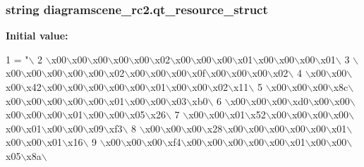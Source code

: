 \subsubsection[{qt\+\_\+resource\+\_\+struct}]{\setlength{\rightskip}{0pt plus 5cm}string diagramscene\+\_\+rc2.\+qt\+\_\+resource\+\_\+struct}\label{namespacediagramscene__rc2_abc24f13854b6fa96199e59b31d757b36}
{\bfseries Initial value\+:}
\begin{DoxyCode}
1 = \textcolor{stringliteral}{"\(\backslash\)}
2 \textcolor{stringliteral}{\(\backslash\)x00\(\backslash\)x00\(\backslash\)x00\(\backslash\)x00\(\backslash\)x00\(\backslash\)x02\(\backslash\)x00\(\backslash\)x00\(\backslash\)x00\(\backslash\)x01\(\backslash\)x00\(\backslash\)x00\(\backslash\)x00\(\backslash\)x01\(\backslash\)}
3 \textcolor{stringliteral}{\(\backslash\)x00\(\backslash\)x00\(\backslash\)x00\(\backslash\)x00\(\backslash\)x00\(\backslash\)x02\(\backslash\)x00\(\backslash\)x00\(\backslash\)x00\(\backslash\)x0f\(\backslash\)x00\(\backslash\)x00\(\backslash\)x00\(\backslash\)x02\(\backslash\)}
4 \textcolor{stringliteral}{\(\backslash\)x00\(\backslash\)x00\(\backslash\)x00\(\backslash\)x42\(\backslash\)x00\(\backslash\)x00\(\backslash\)x00\(\backslash\)x00\(\backslash\)x00\(\backslash\)x01\(\backslash\)x00\(\backslash\)x00\(\backslash\)x02\(\backslash\)x11\(\backslash\)}
5 \textcolor{stringliteral}{\(\backslash\)x00\(\backslash\)x00\(\backslash\)x00\(\backslash\)x8c\(\backslash\)x00\(\backslash\)x00\(\backslash\)x00\(\backslash\)x00\(\backslash\)x00\(\backslash\)x01\(\backslash\)x00\(\backslash\)x00\(\backslash\)x03\(\backslash\)xb0\(\backslash\)}
6 \textcolor{stringliteral}{\(\backslash\)x00\(\backslash\)x00\(\backslash\)x00\(\backslash\)xd0\(\backslash\)x00\(\backslash\)x00\(\backslash\)x00\(\backslash\)x00\(\backslash\)x00\(\backslash\)x01\(\backslash\)x00\(\backslash\)x00\(\backslash\)x05\(\backslash\)x26\(\backslash\)}
7 \textcolor{stringliteral}{\(\backslash\)x00\(\backslash\)x00\(\backslash\)x01\(\backslash\)x52\(\backslash\)x00\(\backslash\)x00\(\backslash\)x00\(\backslash\)x00\(\backslash\)x00\(\backslash\)x01\(\backslash\)x00\(\backslash\)x00\(\backslash\)x09\(\backslash\)xf3\(\backslash\)}
8 \textcolor{stringliteral}{\(\backslash\)x00\(\backslash\)x00\(\backslash\)x00\(\backslash\)x28\(\backslash\)x00\(\backslash\)x00\(\backslash\)x00\(\backslash\)x00\(\backslash\)x00\(\backslash\)x01\(\backslash\)x00\(\backslash\)x00\(\backslash\)x01\(\backslash\)x16\(\backslash\)}
9 \textcolor{stringliteral}{\(\backslash\)x00\(\backslash\)x00\(\backslash\)x00\(\backslash\)xf4\(\backslash\)x00\(\backslash\)x00\(\backslash\)x00\(\backslash\)x00\(\backslash\)x00\(\backslash\)x01\(\backslash\)x00\(\backslash\)x00\(\backslash\)x05\(\backslash\)x8a\(\backslash\)}

\end{DoxyCode}
